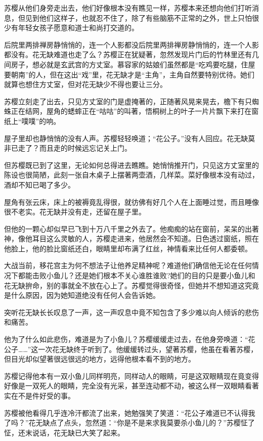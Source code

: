 \documentclass[12pt,oneside]{book}
\begin{document}
苏樱从他们身旁走出去，他们好像根本没有瞧见一样，苏樱本来还想向他们打听消息，但见到他们这样子，也就忍不住了，除了有些脑筋不正常的之外，世上只怕很少有年轻女孩子愿意和道士和尚打交道的。

后院里两排禅房静悄悄的，连一个人影都没后院里两排禅房静悄悄的，连一个人影都没有。花无缺难道也走了么？苏樱正在犹疑著，忽然发现片门后的竹林里还有几间房子，想必就是玄武宫的方丈室。慕容家的姑娘们虽然都是``吃鸡要吃腿，住屋要朝南''的人，但在这出``戏''里，花无缺才是``主角''，主角自然要特别优待。她们就算也想住方丈室，但对花无缺少不得也要让三分。

苏樱立刻走了出去，只见方丈室的门是虚掩著的，正随著风晃来晃去，檐下有只蜘蛛正在结网，屋角的蟋蟀正在``咕咕''的叫著，悟桐树上的叶子一片片飘下来打在窗纸上``噗噗''的响。

屋子里却也静悄悄的没有人声。苏樱轻轻唤道；``花公子。''没有人回应。花无缺莫非已走了？而且走的时候远忘记关上门。

但苏樱既已到了这里，无论如何总得进去瞧瞧。她悄悄推开门，只见这方丈室里的陈设也很简陋，此刻一张自木桌子上摆著两壶酒，几样菜。菜好像根本没有动过，酒却不知已喝了多少。

屋角有张云床，床上的被褥竟乱得很，就彷佛有好几个人在上面睡过觉，而且睡像很不老实。花无缺并没有走，还留在屋子里。

但他的一颗心却似早已飞到十万八千里之外去了。他痴痴的站在窗前，呆呆的出著神，像他耳目这么灵敏的人，苏樱走进来，他居然会不知道。日色透过窗纸，照在他脸上，他的脸比窗纸还白，眼睛里却布满了红丝，神情看来比任何人都委顿。

大战当前，移花宫主为何不想法子让他养足精神呢？难道他们确信他无论在任何情况下都能击败小鱼儿？还是她们根本不关心谁胜谁败?她们的目的只是要小鱼儿和花无缺拚命，别的事就全不放在心上了。苏樱觉得很奇怪，但她并不想知道这究竟是什么原因，因为她知道绝没有任何人会告诉她。

突听花无缺长长叹息了一声，这一声叹息中竟不知包含了多少难以向人倾诉的悲伤和痛苦。

他为了什么如此悲伤，难道是为了小鱼儿？苏樱缓缓走过去，在他身旁唤道：``花公子\ldots\ldots{}''这一次花无缺终于听到了。他缓缓转过头，望著苏樱，他虽在看著苏樱，但目光却似望著很远很远的地方，远得他根本看不到的地方。

苏樱记得他本有一双小鱼儿同样明亮，同样动人的眼睛，可是这双眼睛现在竟变得好像是一双死人的眼睛，完全没有光采，甚至连动都不动，被这么样一双眼睛看著实在不是件好受的事。

苏樱被他看得几乎连冷汗都流了出来，她勉强笑了笑道：``花公子难道已不认得我了吗？''花无缺点了点头，忽然道：``你是不是来求我莫要杀小鱼儿的？''苏樱怔了怔，还末说话，花无缺已大笑了起来。
\end{document}

